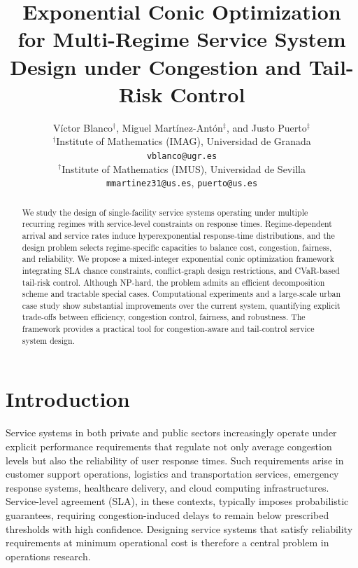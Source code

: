 \documentclass[letter,11pt, reqno]{amsart}
\let\origmaketitle\maketitle
\def\maketitle{
	\begingroup
	\def\uppercasenonmath##1{} %
	\let\MakeUppercase\relax %
	\origmaketitle
	\endgroup
}
\begin{document}
\title[]{\huge Exponential Conic Optimization for Multi-Regime Service System Design under Congestion and Tail-Risk Control}

\author[V. Blanco, M. Mart\'inez-Ant\'on \MakeLowercase{and} J. Puerto]{
{\large V\'ictor Blanco$^{\dagger}$, Miguel Mart\'inez-Ant\'on$^{\ddagger}$, and Justo Puerto$^{\ddagger}$}\medskip\\
$^\dagger$Institute of Mathematics (IMAG), Universidad de Granada\\
\texttt{vblanco@ugr.es}\\
$^\dagger$Institute of Mathematics (IMUS), Universidad de Sevilla\\
\texttt{mmartinez31@us.es}, \texttt{puerto@us.es}
}

\maketitle

\begin{abstract}
We study the design of single-facility service systems operating under multiple recurring regimes with service-level constraints on response times. Regime-dependent arrival and service rates induce hyperexponential response-time distributions, and the design problem selects regime-specific capacities to balance cost, congestion, fairness, and reliability. We propose a mixed-integer exponential conic optimization framework integrating SLA chance constraints, conflict-graph design restrictions, and CVaR-based tail-risk control. Although NP-hard, the problem admits an efficient decomposition scheme and tractable special cases. Computational experiments and a large-scale urban case study show substantial improvements over the current system, quantifying explicit trade-offs between efficiency, congestion control, fairness, and robustness. The framework provides a practical tool for congestion-aware and tail-control service system design.
\end{abstract}


\section{Introduction}

Service systems in both private and public sectors increasingly operate under
explicit performance requirements that regulate not only average congestion
levels but also the reliability of user response times.
Such requirements arise in customer support operations, logistics and
transportation services, emergency response systems, healthcare delivery, and
cloud computing infrastructures.
Service-level agreement (SLA), in these contexts, typically imposes
probabilistic guarantees, requiring congestion-induced delays to remain below
prescribed thresholds with high confidence.
Designing service systems that satisfy reliability requirements at minimum
operational cost is therefore a central problem in operations research.
\end{document}
